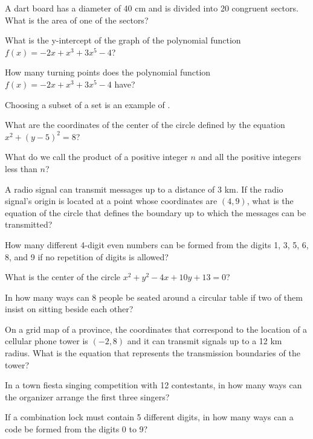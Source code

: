 \begin{questions}
\question A dart board has a diameter of 40 cm and is divided into 20 congruent       sectors. What is the area of one of the sectors?    


\question What is the y-intercept of the graph of the polynomial function $f(x) = -2x + x^3 + 3x^5 -4$?




\question How many turning points does the polynomial function $f(x) = -2x + x^3 + 3x^5 - 4$ have?




\question Choosing  a  subset  of  a  set  is an  example  of \blank.



\question What are the coordinates of the center of the circle defined by the equation $x^2 + (y-5)^2 = 8$?



\question What do we call the  product  of  a  positive  integer  $n$  and  all  the  positive  integers  less than  $n$?   


\question A radio signal can transmit messages up to a distance of 3 km. If the radio
signal’s origin is located at a point whose coordinates are $(4, 9)$, what is
the equation of the circle that defines the boundary up to which the messages can be transmitted?




\question How many  different  4-digit  even  numbers can  be  formed  from  the  digits 1,  3,  5,  6,  8,  and  9  if  no  repetition  of  digits  is allowed? 



\question What is the center of the circle $x^2 + y^2 - 4x + 10y + 13 = 0$?




\question In how many ways can 8  people  be  seated  around  a  circular  table  if two  of  them  insist  on  sitting  beside  each  other? 


\question On a grid map of a province, the coordinates that correspond to the
location of a cellular phone tower is $(-2, 8)$ and it can transmit signals
up to a 12 km radius. What is the equation that represents the transmission boundaries of the tower?



\question In a town fiesta singing competition with 12 contestants, in how many ways can the organizer arrange the first three singers? 


\question If a combination lock must contain 5 different digits, in how many ways can a code be formed from the digits 0 to 9? 




\end{questions}